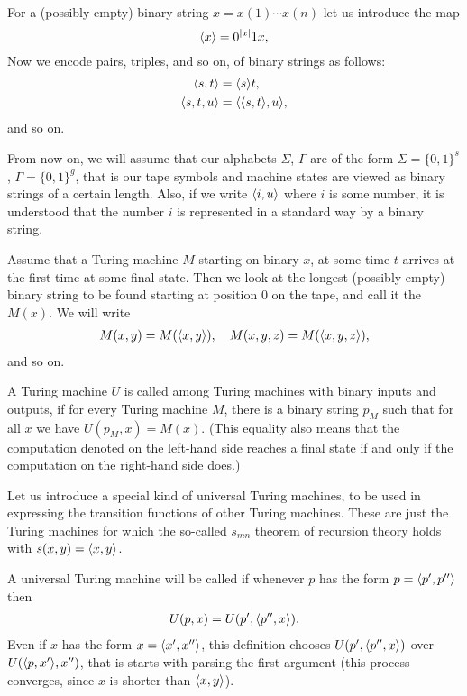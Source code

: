 \documentclass[12pt]{memoir}
\begin{document}
 \begin{definition}
For a (possibly empty) binary string \( x=x(1)\dotsm x(n) \) let us introduce the map
 \[
   {\mathopen\langle x\mathclose\rangle} = 0^{\lvert x \rvert}1 x,
 \]
Now we encode pairs, triples, and so on, of binary strings as follows:
 \begin{align*}
        {\mathopen\langle s,t\mathclose\rangle} &={\mathopen\langle s\mathclose\rangle}t,
\\ {\mathopen\langle s,t,u\mathclose\rangle} &= {\mathopen\langle {\mathopen\langle s,t\mathclose\rangle},u\mathclose\rangle},
 \end{align*}
and so on.

From now on, we will assume that our alphabets \( \Sigma \), \( \Gamma \)
are of the form \( \Sigma=\{0,1\}^{s} \), \( \Gamma=\{0,1\}^{g} \), that is 
our tape symbols and machine states are viewed as binary strings of a certain length.
Also, if we write \( {\mathopen\langle i,u\mathclose\rangle} \) where \( i \) is some number, it is understood
that the number \( i \) is represented in a standard way by a binary string.
\end{definition}

\begin{definition}
 Assume that a Turing machine \( M \) starting on binary \( x \),
 at some time \( t \)
 arrives at the first time at some final state.
 Then we look at the longest (possibly empty)
 binary string to be found starting at position
 0 on the tape, and call it the  \( M(x) \).
We will write
 \begin{align*}
   M(x,y)=M({\mathopen\langle x,y\mathclose\rangle}),\quad M(x,y,z)=M({\mathopen\langle x,y,z\mathclose\rangle}),
 \end{align*}
and so on.

A Turing machine \( U \) is called  
among Turing machines with
binary inputs and outputs, if for every Turing machine \( M \),
there is a binary string \( p_{M} \) such that for all \( x \) we have
\( U(p_{M},x)=M(x) \).
(This equality also means that the computation denoted on the left-hand side 
reaches a final state if and only if the computation on the right-hand side does.)
\end{definition}

Let us introduce a special kind of universal Turing machines, to be
used in expressing the transition functions of other Turing machines.
These are just the Turing machines for which the so-called \( s_{mn} \) theorem
of recursion theory holds with \( s(x,y)={\mathopen\langle x,y\mathclose\rangle} \).

\begin{definition}\label{def:univ-TM}
A universal Turing machine will be called  if 
whenever \( p \) has the form \( p={\mathopen\langle p',p''\mathclose\rangle} \) then
\begin{align*}
 U(p,x)= U(p',{\mathopen\langle p'',x\mathclose\rangle}).
 \end{align*}
Even if \( x \) has the form \(x ={\mathopen\langle x',x''\mathclose\rangle} \), this definition chooses
\( U(p',{\mathopen\langle p'',x\mathclose\rangle}) \) over \( U({\mathopen\langle p,x'\mathclose\rangle},x'') \), that is starts with 
parsing the first argument
(this process converges, since \( x \) is  shorter than \( {\mathopen\langle x,y\mathclose\rangle} \)).
\end{definition}
\end{document}
